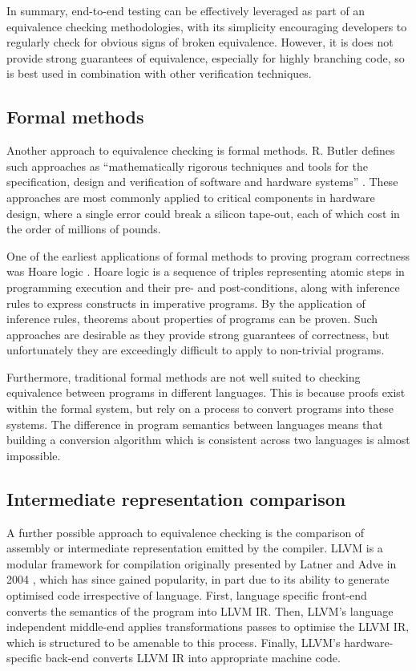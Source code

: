 In summary, end-to-end testing can be effectively leveraged as part of an equivalence checking methodologies, with its simplicity encouraging developers to regularly check for obvious signs of broken equivalence. However, it is does not provide strong guarantees of equivalence, especially for highly branching code, so is best used in combination with other verification techniques.

\subsection{Formal methods}
\label{ssec:equivalence-formal-methods}

Another approach to equivalence checking is formal methods. R. Butler defines such approaches as ``mathematically rigorous techniques and tools for the specification, design and verification of software and hardware systems'' \cite{LangleyFormalMethods}. These approaches are most commonly applied to critical components in hardware design, where a single error could break a silicon tape-out, each of which cost in the order of millions of pounds.

One of the earliest applications of formal methods to proving program correctness was Hoare logic \cite{hoareAxiomaticBasisComputer1969}. Hoare logic is a sequence of triples representing atomic steps in programming execution and their pre- and post-conditions, along with inference rules to express constructs in imperative programs. By the application of inference rules, theorems about properties of programs can be proven. Such approaches are desirable as they provide strong guarantees of correctness, but unfortunately they are exceedingly difficult to apply to non-trivial programs.

Furthermore, traditional formal methods are not well suited to checking equivalence between programs in different languages. This is because proofs exist within the formal system, but rely on a process to convert programs into these systems. The difference in program semantics between languages means that building a conversion algorithm which is consistent across two languages is almost impossible.

\subsection{Intermediate representation comparison}
\label{ssec:equivalence-ir-comparison}

A further possible approach to equivalence checking is the comparison of assembly or intermediate representation emitted by the compiler. LLVM is a modular framework for compilation originally presented by Latner and Adve in 2004 \cite{lattner2004llvm}, which has since gained popularity, in part due to its ability to generate optimised code irrespective of language. First, language specific front-end converts the semantics of the program into \acrfull{LLVM IR}. Then, LLVM's language independent middle-end applies transformations passes to optimise the \acrshort{LLVM IR}, which is structured to be amenable to this process. Finally, LLVM's hardware-specific back-end converts \acrshort{LLVM IR} into appropriate machine code.

